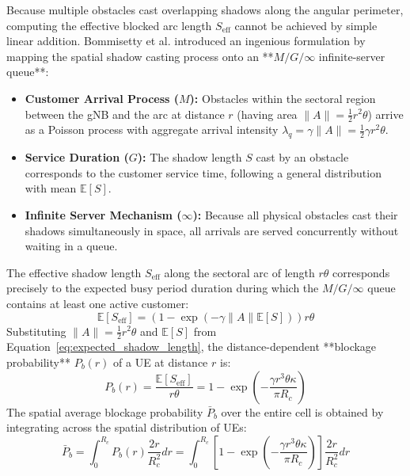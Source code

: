 Because multiple obstacles cast overlapping shadows along the angular perimeter, computing the effective blocked arc length $S_{\mathrm{eff}}$ cannot be achieved by simple linear addition. Bommisetty et al. \cite{bommisetty2022mmwave} introduced an ingenious formulation by mapping the spatial shadow casting process onto an **$M/G/\infty$ infinite-server queue**:
\begin{itemize}
    \item \textbf{Customer Arrival Process ($M$):} Obstacles within the sectoral region between the gNB and the arc at distance $r$ (having area $\|A\| = \frac{1}{2} r^2 \theta$) arrive as a Poisson process with aggregate arrival intensity $\lambda_q = \gamma \|A\| = \frac{1}{2} \gamma r^2 \theta$.
    \item \textbf{Service Duration ($G$):} The shadow length $S$ cast by an obstacle corresponds to the customer service time, following a general distribution with mean $\mathbb{E}[S]$.
    \item \textbf{Infinite Server Mechanism ($\infty$):} Because all physical obstacles cast their shadows simultaneously in space, all arrivals are served concurrently without waiting in a queue.
\end{itemize}

The effective shadow length $S_{\mathrm{eff}}$ along the sectoral arc of length $r \theta$ corresponds precisely to the expected busy period duration during which the $M/G/\infty$ queue contains at least one active customer:
\begin{equation}
    \mathbb{E}[S_{\mathrm{eff}}] = \left( 1 - \exp\left( -\gamma \|A\| \mathbb{E}[S] \right) \right) r \theta
\end{equation}
Substituting $\|A\| = \frac{1}{2} r^2 \theta$ and $\mathbb{E}[S]$ from Equation~\eqref{eq:expected_shadow_length}, the distance-dependent **blockage probability** $P_b(r)$ of a UE at distance $r$ is:
\begin{equation}
    \label{eq:Pb_distance}
    P_b(r) = \frac{\mathbb{E}[S_{\mathrm{eff}}]}{r \theta} = 1 - \exp\left( -\frac{\gamma r^3 \theta \kappa}{\pi R_c} \right)
\end{equation}
The spatial average blockage probability $\bar{P}_b$ over the entire cell is obtained by integrating across the spatial distribution of UEs:
\begin{equation}
    \label{eq:Pb_average}
    \bar{P}_b = \int_0^{R_c} P_b(r) \frac{2r}{R_c^2} dr = \int_0^{R_c} \left[ 1 - \exp\left( -\frac{\gamma r^3 \theta \kappa}{\pi R_c} \right) \right] \frac{2r}{R_c^2} dr
\end{equation}

